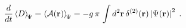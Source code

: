 \begin{equation}
\frac{d}{dt}
\left\langle
D
\right\rangle_{\scriptstyle \!  \Psi}
=
\left\langle
{\mathcal A} ({\bf r})
\right\rangle_{\scriptstyle \!  \Psi}
=
- g \, \pi
\,
\int
d^{2} {\bf r}
\,
\delta^{(2)} ({\bf r})
\left| \Psi ({\bf r})
\right|^{2}
\;  .
\label{eq:time_rate_of_dilation_op_ddim-EV_2D_ISP}
\end{equation}

